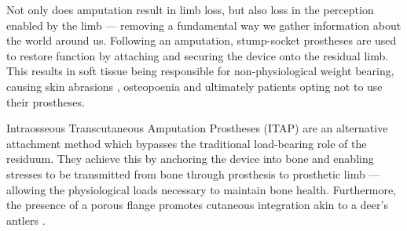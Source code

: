 Not only does amputation result in limb loss, but also loss in the perception enabled by the limb --- removing a fundamental way we gather information about the world around us.
Following an amputation, stump-socket prostheses are used to restore function by attaching and securing the device onto the residual limb.
This results in soft tissue being responsible for non-physiological weight bearing, causing skin abrasions \cite{MeulenbeltHenkEJ2011SPot}, osteopoenia and ultimately patients opting not to use their prostheses.

Intraosseous Transcutaneous Amputation Prostheses (ITAP) \cite{kang_osseocutaneous_2010} are an alternative attachment method which bypasses the traditional load-bearing role of the residuum.
They achieve this by anchoring the device into bone and enabling stresses to be transmitted from bone through prosthesis to prosthetic limb --- allowing the physiological loads necessary to maintain bone health.
Furthermore, the presence of a porous flange promotes cutaneous integration akin to a deer's antlers \cite{PendegrassC.J.2006Natb}.